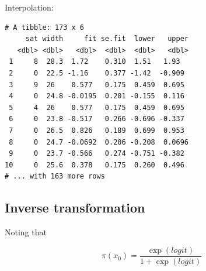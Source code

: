 \documentclass[]{book}
\newenvironment{Shaded}{\begin{snugshade}}{\end{snugshade}}
\newcommand{\DataTypeTok}[1]{\textcolor[rgb]{0.13,0.29,0.53}{#1}}
\newcommand{\DecValTok}[1]{\textcolor[rgb]{0.00,0.00,0.81}{#1}}
\newcommand{\KeywordTok}[1]{\textcolor[rgb]{0.13,0.29,0.53}{\textbf{#1}}}
\newcommand{\NormalTok}[1]{#1}
\newcommand{\OperatorTok}[1]{\textcolor[rgb]{0.81,0.36,0.00}{\textbf{#1}}}
\newcommand{\OtherTok}[1]{\textcolor[rgb]{0.56,0.35,0.01}{#1}}
\newcommand{\StringTok}[1]{\textcolor[rgb]{0.31,0.60,0.02}{#1}}
\begin{document}
Interpolation:

\begin{Shaded}
\end{Shaded}

\begin{verbatim}
# A tibble: 173 x 6
     sat width     fit se.fit  lower   upper
   <dbl> <dbl>   <dbl>  <dbl>  <dbl>   <dbl>
 1     8  28.3  1.72    0.310  1.51   1.93  
 2     0  22.5 -1.16    0.377 -1.42  -0.909 
 3     9  26    0.577   0.175  0.459  0.695 
 4     0  24.8 -0.0195  0.201 -0.155  0.116 
 5     4  26    0.577   0.175  0.459  0.695 
 6     0  23.8 -0.517   0.266 -0.696 -0.337 
 7     0  26.5  0.826   0.189  0.699  0.953 
 8     0  24.7 -0.0692  0.206 -0.208  0.0696
 9     0  23.7 -0.566   0.274 -0.751 -0.382 
10     0  25.6  0.378   0.175  0.260  0.496 
# ... with 163 more rows
\end{verbatim}

\hypertarget{inverse-transformation}{%
\subsection{Inverse transformation}\label{inverse-transformation}}

Noting that

\[\pi(x_0) = \frac{\exp(logit)}{1 + \exp(logit)}\]

\begin{Shaded}
\end{Shaded}
\end{document}
